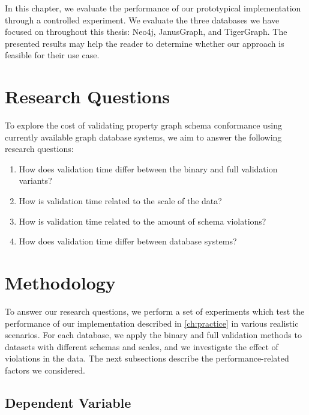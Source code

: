 \documentclass{report}
\theoremstyle{definition}
\begin{document}
In this chapter, we evaluate the performance of our prototypical implementation through a controlled experiment. We evaluate the three databases we have focused on throughout this thesis: Neo4j, JanusGraph, and TigerGraph. The presented results may help the reader to determine whether our approach is feasible for their use case.

\section{Research Questions}

To explore the cost of validating property graph schema conformance using currently available graph database systems, we aim to answer the following research questions:

\begin{enumerate}[label=\bfseries RQ\arabic*,ref=RQ\arabic*]
  \item\label{rq:variant} How does validation time differ between the binary and full validation variants?
  \item\label{rq:scale} How is validation time related to the scale of the data?
  \item\label{rq:violations} How is validation time related to the amount of schema violations?
  \item\label{rq:database} How does validation time differ between database systems?
\end{enumerate}

\section{Methodology}

To answer our research questions, we perform a set of experiments which test the performance of our implementation described in \autoref{ch:practice} in various realistic scenarios. For each database, we apply the binary and full validation methods to datasets with different schemas and scales, and we investigate the effect of violations in the data. The next subsections describe the performance-related factors we considered.

\subsection{Dependent Variable}
\end{document}
